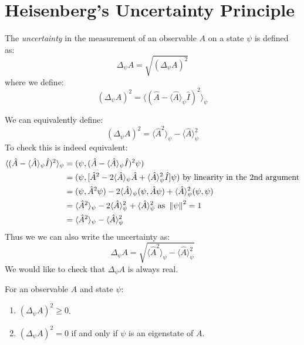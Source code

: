 \documentclass[../main.tex]{subfiles}
\begin{document}
\section{Heisenberg's Uncertainty Principle}
\begin{definition}[Uncertainty]
  The \textit{uncertainty} in the measurement of an observable $A$ on a state $\psi$ is defined as:
  \[
    \Delta_{\psi} A = \sqrt{(\Delta_{\psi} A)^2}
  \]
  where we define:
  \[
    (\Delta_{\psi} A)^2 = \langle (\hat{A} - \langle \hat{A} \rangle_{\psi}\hat{I})^2 \rangle_{\psi}
  \]
\end{definition}
We can equivalently define:
\[
  (\Delta_{\psi} A)^2 = \langle \hat{A}^2 \rangle_{\psi} - \langle \hat{A} \rangle^2_{\psi}
\]
To check this is indeed equivalent:
\begin{align*}
  \langle (\hat{A} - \langle \hat{A} \rangle_{\psi}\hat{I})^2 \rangle_{\psi} &= (\psi, (\hat{A} - \langle \hat{A} \rangle_{\psi} \hat{I})^2 \psi) \\
                                                                             &= (\psi, [\hat{A}^2 - 2\langle \hat{A} \rangle_{\psi} \hat{A} + \langle \hat{A} \rangle_{\psi}^2 \hat{I}]\psi) \text{ by linearity in the 2nd argument}\\
                                                                             &= (\psi, \hat{A}^2 \psi) - 2 \langle \hat{A} \rangle_{\psi} (\psi, \hat{A} \psi) + \langle \hat{A} \rangle_{\psi}^2 (\psi, \psi) \\
                                                                             &= \langle \hat{A}^2 \rangle_{\psi} - 2 \langle \hat{A} \rangle_{\psi}^2 + \langle \hat{A} \rangle_{\psi}^2 \text{ as } \left\lVert \psi \right\rVert^2 = 1 \\
                                                                             &= \langle \hat{A}^2 \rangle_{\psi} - \langle \hat{A} \rangle_{\psi}^2
\end{align*}
Thus we we can also write the uncertainty as:
\[
  \Delta_{\psi} A = \sqrt{\langle \hat{A}^2 \rangle_{\psi} - \langle \hat{A} \rangle_{\psi}^2}
\]
We would like to check that $\Delta_{\psi} A$ is always real.
\begin{lemma}
  For an observable $A$ and state $\psi$:
  \begin{enumerate}
    \item $(\Delta_{\psi} A)^2 \geq 0$.
    \item $(\Delta_{\psi} A)^2 = 0$ if and only if $\psi$ is an eigenstate of $A$.
  \end{enumerate}
\end{lemma}
\end{document}

